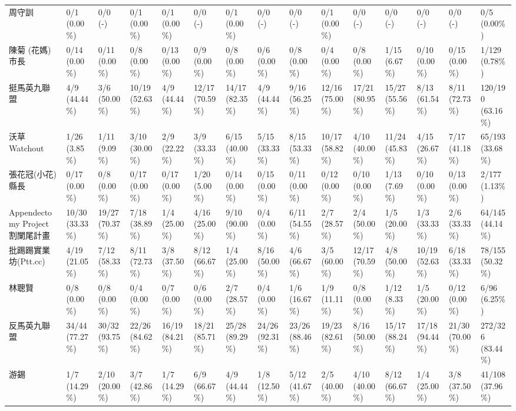 \documentclass[letterpaper, 10pt, conference]{ieeeconf}   %
\begin{document}
\begin{CJK}{UTF8}{bsmi}
\begin{landscape}
\begin{longtable}[c]{@{}L{2.45cm}L{1.1cm}L{1.1cm}L{1.1cm}L{1.1cm}L{1.1cm}L{1.1cm}L{1.1cm}L{1.1cm}L{1.1cm}L{1.1cm}L{1.1cm}L{1.1cm}L{1.1cm}L{1.1cm}@{}}
周守訓 & 0/1 (0.00\%) & 0/0 (-) & 0/1 (0.00\%) & 0/1 (0.00\%) & 0/0 (-) & 0/1 (0.00\%) & 0/0 (-) & 0/0 (-) & 0/1 (0.00\%) & 0/0 (-) & 0/0 (-) & 0/0 (-) & 0/0 (-) & 0/5 (0.00\%) \\
陳菊 (花媽) 市長 & 0/14 (0.00\%) & 0/11 (0.00\%) & 0/8 (0.00\%) & 0/13 (0.00\%) & 0/9 (0.00\%) & 0/8 (0.00\%) & 0/6 (0.00\%) & 0/8 (0.00\%) & 0/4 (0.00\%) & 0/8 (0.00\%) & 1/15 (6.67\%) & 0/10 (0.00\%) & 0/15 (0.00\%) & 1/129 (0.78\%) \\
挺馬英九聯盟 & 4/9 (44.44\%) & 3/6 (50.00\%) & 10/19 (52.63\%) & 4/9 (44.44\%) & 12/17 (70.59\%) & 14/17 (82.35\%) & 4/9 (44.44\%) & 9/16 (56.25\%) & 12/16 (75.00\%) & 17/21 (80.95\%) & 15/27 (55.56\%) & 8/13 (61.54\%) & 8/11 (72.73\%) & 120/190 (63.16\%) \\
沃草 Watchout & 1/26 (3.85\%) & 1/11 (9.09\%) & 3/10 (30.00\%) & 2/9 (22.22\%) & 3/9 (33.33\%) & 6/15 (40.00\%) & 5/15 (33.33\%) & 8/15 (53.33\%) & 10/17 (58.82\%) & 4/10 (40.00\%) & 11/24 (45.83\%) & 4/15 (26.67\%) & 7/17 (41.18\%) & 65/193 (33.68\%) \\
張花冠(小花)縣長 & 0/17 (0.00\%) & 0/8 (0.00\%) & 0/17 (0.00\%) & 0/17 (0.00\%) & 1/20 (5.00\%) & 0/14 (0.00\%) & 0/15 (0.00\%) & 0/11 (0.00\%) & 0/12 (0.00\%) & 0/10 (0.00\%) & 1/13 (7.69\%) & 0/10 (0.00\%) & 0/13 (0.00\%) & 2/177 (1.13\%) \\
Appendectomy Project 割闌尾計畫 & 10/30 (33.33\%) & 19/27 (70.37\%) & 7/18 (38.89\%) & 1/4 (25.00\%) & 4/16 (25.00\%) & 9/10 (90.00\%) & 0/4 (0.00\%) & 6/11 (54.55\%) & 2/7 (28.57\%) & 2/4 (50.00\%) & 1/5 (20.00\%) & 1/3 (33.33\%) & 2/6 (33.33\%) & 64/145 (44.14\%) \\
批踢踢實業坊(Ptt.cc) & 4/19 (21.05\%) & 7/12 (58.33\%) & 8/11 (72.73\%) & 3/8 (37.50\%) & 8/12 (66.67\%) & 1/4 (25.00\%) & 8/16 (50.00\%) & 4/6 (66.67\%) & 3/5 (60.00\%) & 12/17 (70.59\%) & 4/8 (50.00\%) & 10/19 (52.63\%) & 6/18 (33.33\%) & 78/155 (50.32\%) \\
林聰賢 & 0/8 (0.00\%) & 0/8 (0.00\%) & 0/4 (0.00\%) & 0/7 (0.00\%) & 0/6 (0.00\%) & 2/7 (28.57\%) & 0/4 (0.00\%) & 1/6 (16.67\%) & 1/9 (11.11\%) & 0/8 (0.00\%) & 1/12 (8.33\%) & 1/5 (20.00\%) & 0/12 (0.00\%) & 6/96 (6.25\%) \\
反馬英九聯盟 & 34/44 (77.27\%) & 30/32 (93.75\%) & 22/26 (84.62\%) & 16/19 (84.21\%) & 18/21 (85.71\%) & 25/28 (89.29\%) & 24/26 (92.31\%) & 23/26 (88.46\%) & 19/23 (82.61\%) & 8/16 (50.00\%) & 15/17 (88.24\%) & 17/18 (94.44\%) & 21/30 (70.00\%) & 272/326 (83.44\%) \\
游錫\charkun{} & 1/7 (14.29\%) & 2/10 (20.00\%) & 3/7 (42.86\%) & 1/7 (14.29\%) & 6/9 (66.67\%) & 4/9 (44.44\%) & 1/8 (12.50\%) & 5/12 (41.67\%) & 2/5 (40.00\%) & 4/10 (40.00\%) & 8/12 (66.67\%) & 1/4 (25.00\%) & 3/8 (37.50\%) & 41/108 (37.96\%) \\

\end{longtable}
\end{landscape}
\end{CJK}
\end{document}
